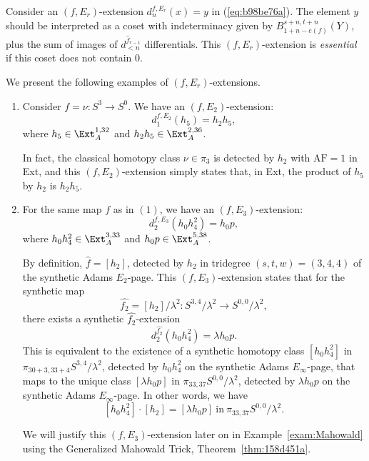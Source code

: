 \documentclass{amsart}
\numberwithin{equation}{section}
\newcommand{\AF}{\mathrm{AF}}
\begin{document}
\begin{remark} \label{def:fErextess}
Consider an $(f,E_r)$-extension $d_{n}^{f,E_r}(x)=y$ in (\ref{eq:b98be76a}).
    The element $y$ should be interpreted as a coset with indeterminacy given by $B_{1+n-e(f)}^{s+n,t+n}(Y)$, plus the sum of images of $d^{\hat f_{r-1}}_{<n}$ differentials.   This $(f,E_r)$-extension is \emph{essential} if this coset does not contain 0.
\end{remark}

\begin{example} \label{exam:extonEn}
We present the following examples of $(f, E_r)$-extensions.
    \begin{enumerate}
        \item Consider $f = \nu: S^3 \rightarrow S^0$. We have an $(f, E_2)$-extension:
        $$d_1^{f, E_2} (h_5) = h_2 h_5,$$
        where $h_5 \in \Ext_A^{1,32}$ and $h_2 h_5 \in \Ext_A^{2,36}$.
        
        In fact, the classical homotopy class $\nu \in \pi_3$ is detected by $h_2$ with $\AF=1$ in Ext, and this $(f, E_2)$-extension simply states that, in Ext, the product of $h_5$ by $h_2$ is $h_2 h_5$.

        \item For the same map $f$ as in $(1)$, we have an $(f, E_3)$-extension:
        $$d_2^{f, E_3} (h_0h_4^2) = h_0 p,$$
        where $h_0 h_4^2 \in \Ext_A^{3,33}$ and $h_0 p \in \Ext_A^{5,38}$.
        
        By definition, $\hat{f} = [h_2]$, detected by $h_2$ in tridegree $(s,t,w) = (3,4,4)$ of the synthetic Adams $E_2$-page. This $(f, E_3)$-extension states that for the synthetic map 
        $$\hat{f_{2}} = [h_2]/\lambda^2: S^{3,4}/\lambda^2 \rightarrow S^{0,0}/\lambda^2,$$ 
        there exists a synthetic $\hat{f_{2}}$-extension
        $$d_2^{\hat{f_{2}}} (h_0h_4^2) = \lambda h_0 p.$$
        This is equivalent to the existence of a synthetic homotopy class $[h_0 h_4^2]$ in $\pi_{30+3, 33+4} S^{3,4}/\lambda^2$, detected by $h_0h_4^2$ on the synthetic Adams $E_\infty$-page, that maps to the unique class $[\lambda h_0 p]$ in $\pi_{33, 37} S^{0,0}/\lambda^2$, detected by $\lambda h_0 p$ on the synthetic Adams $E_\infty$-page. In other words, we have
        $$[h_0 h_4^2] \cdot [h_2] = [\lambda h_0 p] \ \text{in} \ \pi_{33, 37} S^{0,0}/\lambda^2.$$

        We will justify this $(f, E_3)$-extension later on in Example~\ref{exam:Mahowald} using the Generalized Mahowald Trick, Theorem~\ref{thm:158d451a}.


\end{enumerate}
\end{example}
\end{document}
